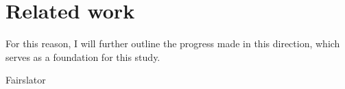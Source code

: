 \chapter{Related work}
\label{ch:Related_work}


For this reason, I will further outline the progress made in this direction, which serves as a foundation for this study.



Fairslator \parencite{bias_taxonomy}

